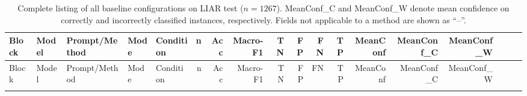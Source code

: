\begin{landscape}
\scriptsize
\setlength{\tabcolsep}{1.5pt}
\renewcommand{\arraystretch}{1.05}

\begin{longtable}{l P{2.9cm} P{4cm} l P{2.2cm} r r r r r r r r r r r r r}
\caption{Complete listing of all baseline configurations on LIAR test ($n=1267$). MeanConf\_C and MeanConf\_W denote mean confidence on correctly and incorrectly classified instances, respectively. Fields not applicable to a method are shown as ``--''.}
\label{tab:appendix_all_baselines_full}\\
\toprule
Block & Model & Prompt/Method & Mode & Condition & n & Acc & Macro-F1 & TN & FP & FN & TP &
MeanConf & MeanConf\_C & MeanConf\_W \\
\midrule
\endfirsthead

\toprule
Block & Model & Prompt/Method & Mode & Condition & n & Acc & Macro-F1 & TN & FP & FN & TP &
MeanConf & MeanConf\_C & MeanConf\_W \\
\midrule
\endhead

\bottomrule
\endfoot


\end{longtable}
\end{landscape}
